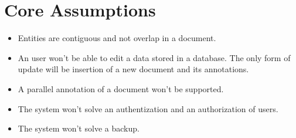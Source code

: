 \section{Core Assumptions}
\begin{itemize}
	\item Entities are contiguous and not overlap in a document.
	\item An user won't be able to edit a data stored in a database. The only form
	of update will be insertion of a new document and its annotations.
	\item A parallel annotation of a document won't be supported.
	\item The system won't solve an authentization and  an authorization of users.
	\item The system won't solve a backup.
\end{itemize}


